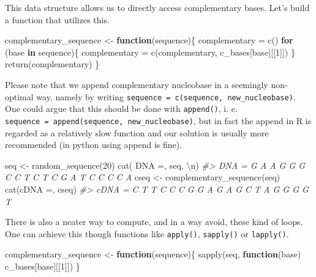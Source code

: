 \documentclass[
]{book}
\newenvironment{Shaded}{\begin{snugshade}}{\end{snugshade}}
\newcommand{\CommentTok}[1]{\textcolor[rgb]{0.56,0.35,0.01}{\textit{#1}}}
\newcommand{\ControlFlowTok}[1]{\textcolor[rgb]{0.13,0.29,0.53}{\textbf{#1}}}
\newcommand{\DecValTok}[1]{\textcolor[rgb]{0.00,0.00,0.81}{#1}}
\newcommand{\FunctionTok}[1]{\textcolor[rgb]{0.00,0.00,0.00}{#1}}
\newcommand{\NormalTok}[1]{#1}
\newcommand{\OtherTok}[1]{\textcolor[rgb]{0.56,0.35,0.01}{#1}}
\newcommand{\SpecialCharTok}[1]{\textcolor[rgb]{0.00,0.00,0.00}{#1}}
\newcommand{\StringTok}[1]{\textcolor[rgb]{0.31,0.60,0.02}{#1}}
\begin{document}
This data structure allows us to directly access complementary bases. Let's build a function that utilizes this.

\begin{Shaded}
\begin{Highlighting}[]
\NormalTok{complementary\_sequence }\OtherTok{\textless{}{-}} \ControlFlowTok{function}\NormalTok{(sequence)\{}
\NormalTok{  complementary }\OtherTok{=} \FunctionTok{c}\NormalTok{()}
  \ControlFlowTok{for}\NormalTok{ (base }\ControlFlowTok{in}\NormalTok{ sequence)\{}
\NormalTok{    complementary }\OtherTok{=} \FunctionTok{c}\NormalTok{(complementary, c\_bases[base][[}\DecValTok{1}\NormalTok{]])}
\NormalTok{  \}}
  \FunctionTok{return}\NormalTok{(complementary)}
\NormalTok{\}}
\end{Highlighting}
\end{Shaded}

Please note that we append complementary nucleobase in a seemingly non-optimal way, namely by writing \texttt{sequence\ =\ c(sequence,\ new\_nucleobase)}. One could argue that this should be done with \texttt{append()}, i. e. \texttt{sequence\ =\ append(sequence,\ new\_nucleobase)}, but in fact the append in R is regarded as a relatively slow function and our solution is usually more recommended (in python using append is fine).

\begin{Shaded}
\begin{Highlighting}[]
\NormalTok{seq }\OtherTok{\textless{}{-}} \FunctionTok{random\_sequence}\NormalTok{(}\DecValTok{20}\NormalTok{)}
\FunctionTok{cat}\NormalTok{(}\StringTok{\textquotesingle{} DNA =\textquotesingle{}}\NormalTok{, seq, }\StringTok{\textquotesingle{}}\SpecialCharTok{\textbackslash{}n}\StringTok{\textquotesingle{}}\NormalTok{)}
\CommentTok{\#\textgreater{}  DNA = G A A G G G C C T C T C G A T C C C C A}
\NormalTok{cseq }\OtherTok{\textless{}{-}} \FunctionTok{complementary\_sequence}\NormalTok{(seq)}
\FunctionTok{cat}\NormalTok{(}\StringTok{\textquotesingle{}cDNA =\textquotesingle{}}\NormalTok{, cseq)}
\CommentTok{\#\textgreater{} cDNA = C T T C C C G G A G A G C T A G G G G T}
\end{Highlighting}
\end{Shaded}

There is also a neater way to compute, and in a way avoid, these kind of loops. One can achieve this though functions like \texttt{apply()}, \texttt{sapply()} or \texttt{lapply()}.

\begin{Shaded}
\begin{Highlighting}[]
\NormalTok{complementary\_sequence }\OtherTok{\textless{}{-}} \ControlFlowTok{function}\NormalTok{(sequence)\{}
  \FunctionTok{sapply}\NormalTok{(seq, }\ControlFlowTok{function}\NormalTok{(base) c\_bases[base][[}\DecValTok{1}\NormalTok{]])}
\NormalTok{\}}
\end{Highlighting}
\end{Shaded}
\end{document}

